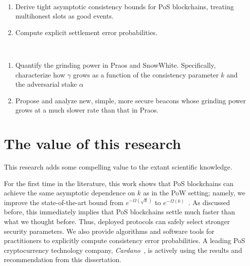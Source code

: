 \begin{description}[font=\normalfont\itshape\space]
  \item[Consistency Problem:]~
  \begin{enumerate}
    \item Derive tight asymptotic consistency bounds for PoS blockchains, 
    treating multihonest slots as good events.

    \item Compute explicit settlement error probabilities.

    \setcounter{ConsistencyObjectives}{\value{enumi}}
  \end{enumerate}

  \item[Grinding Problem:]~
  \begin{enumerate}
    \setcounter{enumi}{\value{ConsistencyObjectives}}

    \item Quantify the grinding power in Praos and SnowWhite. 
    Specifically, characterize how $\gamma$ grows 
    as a function of the consistency parameter $k$ and the adversarial stake $\alpha$
    
    \item Propose and analyze new, simple, more secure beacons 
    whose grinding power grows at a much slower rate than that in Praos.
  \end{enumerate}
\end{description}





\section{The value of this research}


This research adds some compelling value to the extant scientific knowledge. 

For the first time in the literature, 
this work shows that 
PoS blockchains can achieve the same asymptotic dependence on $k$ 
as in the PoW setting; namely, we improve the state-of-the-art bound 
from $e^{-\Omega(\sqrt{k})}$ to $e^{-\Omega(k)}$~\cite{LinearConsistencySODA}. 
As discussed before, this immediately implies that 
PoS blockchains settle much faster than what we thought before. 
Thus, deployed protocols can safely select stronger security parameters. 
We also provide algorithms and software tools 
for practitioners to explicitly compute consistency error probabilities. 
A leading PoS cryptocurrency technology company, \emph{Cardano}~\cite{Cardano}, 
is actively using the results and recommendation from this dissertation.

